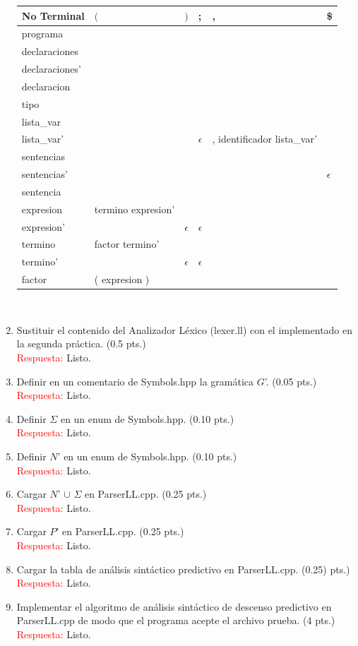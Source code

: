 \documentclass[11pt]{report}
\begin{document}
\begin{enumerate}
  \begin{tabular}{ |l|l|l|l|l|l| }
    \hline
    \textbf{No Terminal} & \textbf{$($} & \textbf{$)$} & \textbf{;} & \textbf{,} & \textbf{\$} \\
    \hline
    programa & & & & & \\
    declaraciones & & & & & \\
    declaraciones' & & & & & \\
    declaracion & & & & & \\
    tipo & & & & & \\
    lista\_var & & & & & \\
    lista\_var' & & & $\epsilon$ & , identificador lista\_var' & \\
    sentencias & & & & & \\
    sentencias' & & & & & $\epsilon$\\
    sentencia & & & & & \\
    expresion & termino expresion' & & & & \\
    expresion' & & $\epsilon$ & $\epsilon$ & & \\
    termino & factor termino' & & & & \\
    termino' & & $\epsilon$ & $\epsilon$ & & \\
    factor & ( expresion )& & & & \\
    \hline
  \end{tabular} \\

   \item Sustituir el contenido del Analizador Léxico (lexer.ll) con el
  implementado en la segunda práctica. (0.5 pts.) \\
    \textcolor{red}{Respuesta:} Listo.
  \item Definir en un comentario de Symbols.hpp la gramática $G$'. (0.05 pts.) \\
    \textcolor{red}{Respuesta:} Listo.
  \item Definir $\Sigma$ en un enum de Symbols.hpp. (0.10 pts.) \\
    \textcolor{red}{Respuesta:} Listo.
  \item Definir $N$' en un enum de Symbols.hpp. (0.10 pts.) \\
    \textcolor{red}{Respuesta:} Listo.
  \item Cargar $N$' $\cup$ $\Sigma$ en ParserLL.cpp. (0.25 pts.) \\
    \textcolor{red}{Respuesta:} Listo.
  \item Cargar $P$' en ParserLL.cpp. (0.25 pts.) \\
    \textcolor{red}{Respuesta:} Listo.
  \item Cargar la tabla de análisis sintáctico predictivo en ParserLL.cpp. (0.25)
  pts.) \\
    \textcolor{red}{Respuesta:} Listo.
  \item Implementar el algoritmo de análisis sintáctico de descenso predictivo
  en ParserLL.cpp de modo que el programa acepte el archivo prueba. (4 pts.) \\
    \textcolor{red}{Respuesta:} Listo.
\end{enumerate}
\end{document}
